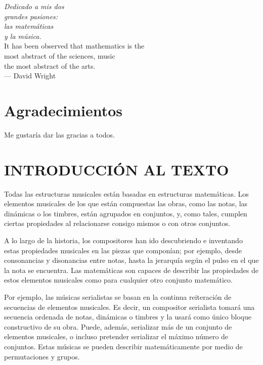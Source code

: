 \pagestyle{plain}
\thispagestyle{empty}

	\vspace*{\bigskipamount}
	\begin{flushright}
		\textit{Dedicado a mis dos \\
			grandes pasiones: \\
			las matemáticas \\
			y la música.} \\
		
		\vfill
		It has been observed that mathematics is the\\
		most abstract of the sciences, music\\
		the most abstract of the arts.\\
		\bigskip
		 --- David Wright \cite{wright}
	\end{flushright}
	
	\chapter*{Agradecimientos}
	
		Me gustaría dar las gracias a todos.
	
	
	\chapter*{\vspace*{-4\bigskipamount}INTRODUCCIÓN AL TEXTO}
		Todas las estructuras musicales están basadas en estructuras matemáticas. Los elementos musicales de los que están compuestas las obras, como las notas, las dinámicas o los timbres, están agrupados en conjuntos, y, como tales, cumplen ciertas propiedades al relacionarse consigo mismos o con otros conjuntos.
		
		A lo largo de la historia, los compositores han ido descubriendo e inventando estas propiedades musicales en las piezas que componían; por ejemplo, desde consonancias y disonancias entre notas, hasta la jerarquía según el pulso en el que la nota se encuentra. Las matemáticas son capaces de describir las propiedades de estos elementos musicales como para cualquier otro conjunto matemático.
		
		Por ejemplo, las músicas serialistas se basan en la continua reiteración de secuencias de elementos musicales. Es decir, un compositor serialista tomará una secuencia ordenada de notas, dinámicas o timbres y la usará como único bloque constructivo de su obra. Puede, además, serializar más de un conjunto de elementos musicales, o incluso pretender serializar el máximo número de conjuntos. Estas músicas se pueden describir matemáticamente por medio de permutaciones y grupos.
		
